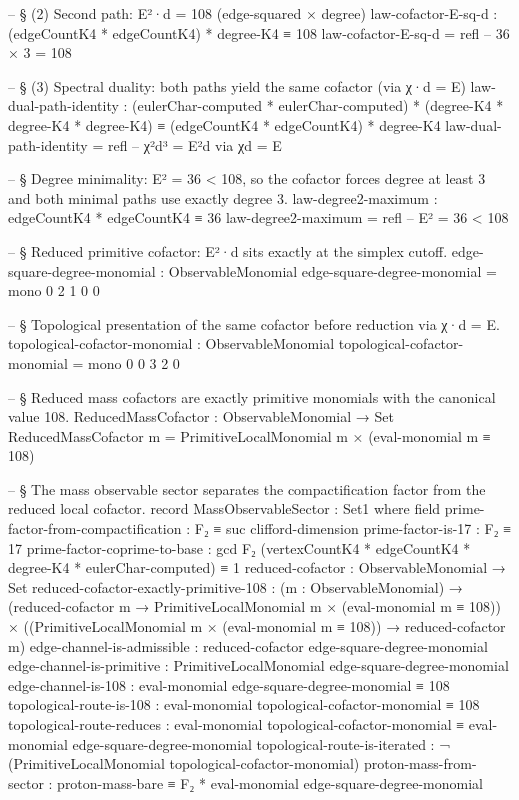 \documentclass[11pt,a4paper]{book}
\begin{document}
\begin{code}
-- § (2) Second path: E²·d = 108 (edge-squared × degree)
law-cofactor-E-sq-d :
  (edgeCountK4 * edgeCountK4) * degree-K4 ≡ 108
law-cofactor-E-sq-d = refl       -- 36 × 3 = 108

-- § (3) Spectral duality: both paths yield the same cofactor (via χ·d = E)
law-dual-path-identity :
  (eulerChar-computed * eulerChar-computed) * (degree-K4 * degree-K4 * degree-K4)
  ≡ (edgeCountK4 * edgeCountK4) * degree-K4
law-dual-path-identity = refl    -- χ²d³ = E²d via χd = E

-- § Degree minimality: E² = 36 < 108, so the cofactor forces degree at least 3 and both minimal paths use exactly degree 3.
law-degree2-maximum : edgeCountK4 * edgeCountK4 ≡ 36
law-degree2-maximum = refl       -- E² = 36 < 108

-- § Reduced primitive cofactor: E²·d sits exactly at the simplex cutoff.
edge-square-degree-monomial : ObservableMonomial
edge-square-degree-monomial = mono 0 2 1 0 0

-- § Topological presentation of the same cofactor before reduction via χ·d = E.
topological-cofactor-monomial : ObservableMonomial
topological-cofactor-monomial = mono 0 0 3 2 0

-- § Reduced mass cofactors are exactly primitive monomials with the canonical value 108.
ReducedMassCofactor : ObservableMonomial → Set
ReducedMassCofactor m = PrimitiveLocalMonomial m × (eval-monomial m ≡ 108)

-- § The mass observable sector separates the compactification factor from the reduced local cofactor.
record MassObservableSector : Set1 where
  field
    prime-factor-from-compactification : F₂ ≡ suc clifford-dimension
    prime-factor-is-17 : F₂ ≡ 17
    prime-factor-coprime-to-base :
      gcd F₂ (vertexCountK4 * edgeCountK4 * degree-K4 * eulerChar-computed) ≡ 1
    reduced-cofactor : ObservableMonomial → Set
    reduced-cofactor-exactly-primitive-108 :
      (m : ObservableMonomial) →
      (reduced-cofactor m → PrimitiveLocalMonomial m × (eval-monomial m ≡ 108))
      × ((PrimitiveLocalMonomial m × (eval-monomial m ≡ 108)) → reduced-cofactor m)
    edge-channel-is-admissible : reduced-cofactor edge-square-degree-monomial
    edge-channel-is-primitive : PrimitiveLocalMonomial edge-square-degree-monomial
    edge-channel-is-108 : eval-monomial edge-square-degree-monomial ≡ 108
    topological-route-is-108 : eval-monomial topological-cofactor-monomial ≡ 108
    topological-route-reduces :
      eval-monomial topological-cofactor-monomial
      ≡ eval-monomial edge-square-degree-monomial
    topological-route-is-iterated : ¬ (PrimitiveLocalMonomial topological-cofactor-monomial)
    proton-mass-from-sector :
      proton-mass-bare ≡
      F₂ * eval-monomial edge-square-degree-monomial


\end{code}
\end{document}
